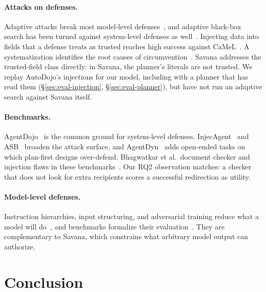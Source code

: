\documentclass[letterpaper,twocolumn,10pt]{article}
\newcommand{\sys}{Savana}
\begin{document}
\paragraph{Attacks on defenses.} Adaptive attacks break most model-level
defenses~\cite{nasr2026attacker}, and adaptive black-box search has been
turned against system-level defenses as well~\cite{ma2026autodojo}.
Injecting data into fields that a defense treats as trusted reaches high
success against CaMeL~\cite{adi2026}. A systematization identifies the
root causes of circumvention~\cite{sok2025ipi}. \sys{} addresses the
trusted-field class directly: in \sys{}, the planner's literals are not
trusted. We replay AutoDojo's injections for our model, including with a
planner that has read them (\S\ref{sec:eval-injection},
\S\ref{sec:eval-planner}), but have not run an adaptive search against
\sys{} itself.

\paragraph{Benchmarks.} AgentDojo~\cite{debenedetti2024agentdojo} is the
common ground for system-level defenses. InjecAgent~\cite{zhan2024injecagent}
and ASB~\cite{zhang2025asb} broaden the attack surface, and
AgentDyn~\cite{li2026agentdyn} adds open-ended tasks on which plan-first
designs over-defend. Bhagwatkar et al.\ document checker and injection
flaws in these benchmarks~\cite{bhagwatkar2025firewalls}. Our RQ2
observation matches: a checker that does not look for extra recipients
scores a successful redirection as utility.

\paragraph{Model-level defenses.} Instruction hierarchies, input
structuring, and adversarial training reduce what a model will
do~\cite{wallace2024hierarchy,hines2024spotlighting,chen2025struq,chen2025secalign},
and benchmarks formalize their evaluation~\cite{liu2024formalizing}. They
are complementary to \sys{}, which constrains what arbitrary model output
can authorize.

\section{Conclusion}
\label{sec:conclusion}
\end{document}
